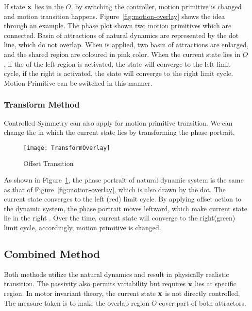 If  state $\mathbf{x}$ lies in the $O$, by switching the \cpg controller, motion primitive is changed and motion transition happens.
Figure~\ref{fig:motion-overlay} shows the idea through an example.
The phase plot shown two motion primitives which are connected.
Basin of attractions of natural dynamics are represented by the dot line, which do not overlap.
When \cpg is applied, two basin of attractions are enlarged, and the shared region are coloured in pink color.
When the current state lies in $O$, if the \cpg of the left region is activated, the state will converge to the left limit cycle,
if the right \cpg is activated, the state will converge to the right limit cycle.
Motion Primitive can be switched in this manner.






\subsubsection*{Transform Method}
Controlled Symmetry can also apply for motion primitive transition.
We can change the \boa in which the current state lies by transforming the phase portrait.

\begin{figure}[!htbp]
  \begin{center}
      \texttt{[image: TransformOverlay]}
    \caption{Offset Transition}
    \label{fig:transform-offset}
  \end{center}
\end{figure}




As shown in Figure~\ref{fig:transform-offset}, the phase portrait of natural dynamic system is the same as that of Figure~\ref{fig:motion-overlay}, which is also drawn by the dot.
The current state converges to the left (red) limit cycle.
By applying offset action to the dynamic system, the phase portrait  moves leftward, which make current state lie in the right \boa.
Over the time, current state will converge to the right(green) limit cycle, accordingly, motion primitive is changed.







\subsection{Combined Method}
Both methods utilize the natural dynamics and  result in physically realistic transition.
The passivity also permits variability but requires $\mathbf{x}$ lies at specific region.
In motor invariant theory, the current state $\mathbf{x}$ is not directly controlled,
The measure taken is to make the overlap region $O$ cover part of both attractors.

